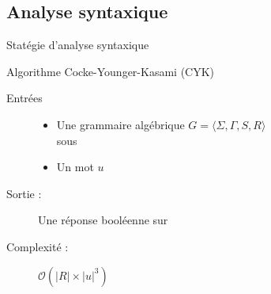 
\begingroup

\subsection{Analyse syntaxique}

\begin{frame}{Statégie d'analyse syntaxique}
  \begin{block}{Algorithme Cocke-Younger-Kasami (CYK)}

    \begin{description}
    \item [Entrées]
      \begin{itemize}
      \item Une grammaire algébrique $G = \langle \Sigma, \Gamma, S, R \rangle$ \\ sous 
      \item Un mot $u$
      \end{itemize}

    \item [Sortie :] Une réponse booléenne sur 

    \item [Complexité :] $\mathcal{O}\left(|R| \times |u|^3 \right)$
    \end{description}
  \end{block}
\end{frame}

